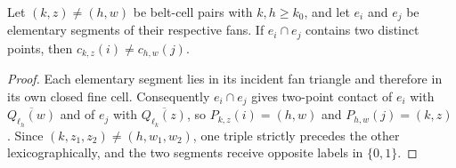 \begin{lemma}
    \label{thm:area_law_belt_fan_contact_colors}
    \leanok
    Let $(k,z)\ne(h,w)$ be belt-cell pairs with $k,h\ge k_0$, and let $e_i$ and
    $e_j$ be elementary segments of their respective fans.
    If $e_i\cap e_j$ contains two distinct points, then
    $c_{k,z}(i)\ne c_{h,w}(j)$.
\end{lemma}
\begin{proof}\leanok
    Each elementary segment lies in its incident fan triangle and therefore in
    its own closed fine cell. Consequently $e_i\cap e_j$ gives two-point contact
    of $e_i$ with $\overline{Q_{\ell_h}(w)}$ and of $e_j$ with
    $\overline{Q_{\ell_k}(z)}$, so $P_{k,z}(i)=(h,w)$ and $P_{h,w}(j)=(k,z)$.
    Since $(k,z_1,z_2)\ne(h,w_1,w_2)$, one triple strictly precedes the other
    lexicographically, and the two segments receive opposite labels in
    $\{0,1\}$.
\end{proof}
